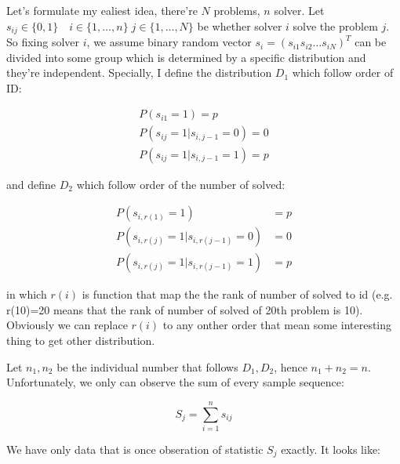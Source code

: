 \documentclass{article}
\begin{document}
Let's formulate my ealiest idea, there're $N$ problems, $n$ solver. Let 
$s_{ij} \in \{ 0,1 \} \quad i \in \{ 1,\dots,n \} \; j \in \{ 1,\dots,N \}$ be whether solver $i$ solve the problem $j$.
So fixing solver $i$, we assume binary random vector $s_i = ( s_{i1} s_{i2} \dots s_{iN} )^T$ 
can be divided into some group which is determined by a specific distribution and they're independent.
Specially, I define the distribution $D_1$ which follow order of ID:


\begin{align*} %
P(s_{i1} = 1) = p \\
P(s_{ij} = 1 | s_{i,j-1}=0) = 0 \\
P(s_{ij} = 1 | s_{i,j-1}=1) = p
\end{align*}


and define $D_2$ which follow order of the number of solved:


\begin{align*}
P(s_{i,r(1)} = 1) &= p \\
P(s_{i,r(j)} = 1 | s_{i,r(j-1)}=0) &= 0 \\
P(s_{i,r(j)} = 1 | s_{i,r(j-1)}=1) &= p
\end{align*}


in which $r(i)$ is function that map the the rank of number of solved to id
(e.g. r(10)=20 means that the rank of number of solved of 20th problem is 10).
Obviously we can replace $r(i)$ to any onther order that mean some interesting thing to get other distribution.

Let $n_1,n_2$ be the individual number that follows $D_1,D_2$, hence $n_1+n_2=n$. Unfortunately, we only can 
observe the sum of every sample sequence:

\[
S_j = \sum_{i=1}^n s_{ij}
\]

We have only data that is once obseration of statistic $S_j$ exactly. It looks like:
\end{document}
